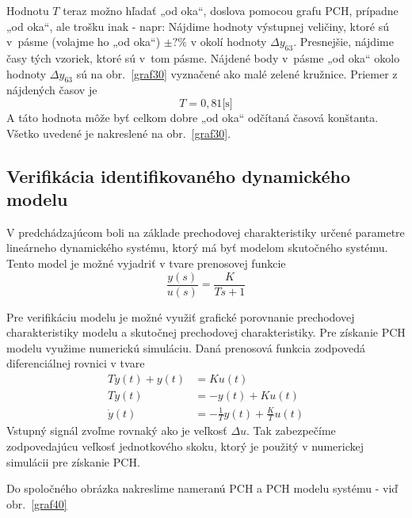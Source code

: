 \documentclass[a4paper, 10pt, ]{article}
\begin{document}
Hodnotu $T$ teraz možno hľadať „od oka“, doslova pomocou grafu PCH, prípadne „od oka“, ale trošku inak - napr: Nájdime hodnoty výstupnej veličiny, ktoré sú v~pásme (volajme ho „od oka“) $\pm ? \%$ v okolí hodnoty $\Delta y_{63}$. Presnejšie, nájdime časy tých vzoriek, ktoré sú v~tom pásme. Nájdené body v~pásme „od oka“ okolo hodnoty $\Delta y_{63}$ sú na obr.~\ref{graf30} vyznačené ako malé zelené kružnice. Priemer z nájdených časov je
\begin{equation}
    T =  0,81 \text{[s]}
\end{equation}
A táto hodnota môže byť celkom dobre „od oka“ odčítaná časová konštanta. Všetko uvedené je nakreslené na obr.~\ref{graf30}.





\subsection{Verifikácia identifikovaného dynamického modelu}


V predchádzajúcom boli na základe prechodovej charakteristiky určené parametre lineárneho dynamického systému, ktorý má byť modelom skutočného systému. Tento model je možné vyjadriť v tvare prenosovej funkcie
\begin{equation}
    \frac{y(s)}{u(s)} = \frac{K}{Ts+1}
\end{equation}



Pre verifikáciu modelu je možné využiť grafické porovnanie prechodovej charakteristiky modelu a skutočnej prechodovej charakteristiky. Pre získanie PCH modelu využime numerickú simuláciu. Daná prenosová funkcia zodpovedá diferenciálnej rovnici v tvare
\begin{align}
    T \dot y(t) + y(t) &= K u(t) \\
    T \dot y(t) &= - y(t) + K u(t) \\
    \dot y(t) &= - \frac{1}{T} y(t) + \frac{K}{T} u(t)
\end{align}
Vstupný signál zvoľme rovnaký ako je veľkosť $\Delta u$. Tak zabezpečíme zodpovedajúcu veľkosť jednotkového skoku, ktorý je použitý v numerickej simulácii pre získanie PCH.

Do spoločného obrázka nakreslime nameranú PCH a PCH modelu systému - viď obr.~\ref{graf40}
\end{document}

